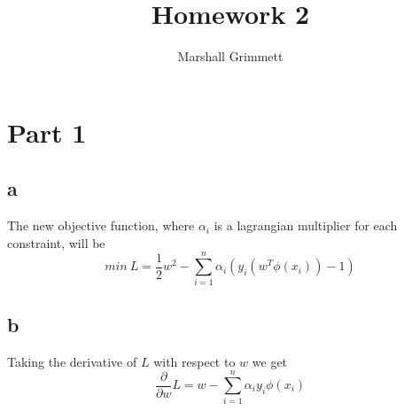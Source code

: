 \documentclass{article}
\title{Homework 2}
\author{Marshall Grimmett}
\begin{document}
\setlength{\parindent}{0pt}
\maketitle





\section{Part 1}

\subsection{a}
The new objective function, where $\alpha_i$ is a lagrangian multiplier
for each constraint, will be
\begin{equation*}
  min\ L = \frac{1}{2}w^2 - \sum_{i=1}^{n}\alpha_i(y_i(w^T \phi(x_i)) - 1)
\end{equation*}

\subsection{b}
Taking the derivative of $L$ with respect to $w$ we get
\begin{equation*}
  \frac{\partial}{\partial w} L = w - \sum_{i=1}^{n}\alpha_i y_i \phi(x_i)
\end{equation*}
\end{document}

